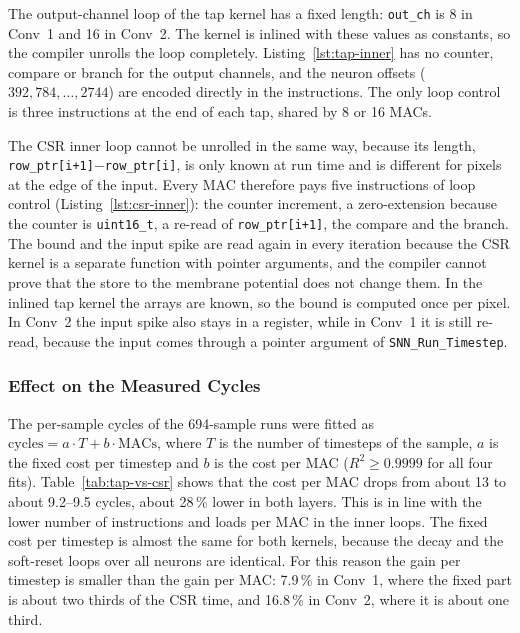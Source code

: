 The output-channel loop of the tap kernel has a fixed length: \texttt{out\_ch} is 8 in Conv~1
and 16 in Conv~2. The kernel is inlined with these values as constants, so the compiler unrolls
the loop completely. Listing~\ref{lst:tap-inner} has no counter, compare or branch for the
output channels, and the neuron offsets ($392, 784, \dots, 2744$) are encoded directly in the
instructions. The only loop control is three instructions at the end of each tap, shared by 8
or 16 MACs.

The CSR inner loop cannot be unrolled in the same way, because its length,
\texttt{row\_ptr[i+1]}$-$\texttt{row\_ptr[i]}, is only known at run time and is different for
pixels at the edge of the input. Every MAC therefore pays five instructions of loop control
(Listing~\ref{lst:csr-inner}):
the counter increment, a zero-extension because the counter is \texttt{uint16\_t}, a re-read of
\texttt{row\_ptr[i+1]}, the compare and the branch. The bound and the input spike are read again
in every iteration because the CSR kernel is a separate function with pointer arguments, and the
compiler cannot prove that the store to the membrane potential does not change them. In the
inlined tap kernel the arrays are known, so the bound is computed once per pixel. In Conv~2 the
input spike also stays in a register, while in Conv~1 it is still re-read, because the input
comes through a pointer argument of \texttt{SNN\_Run\_Timestep}.

\subsubsection*{Effect on the Measured Cycles}

The per-sample cycles of the 694-sample runs were fitted as
$\mathrm{cycles} = a \cdot T + b \cdot \mathrm{MACs}$, where $T$ is the number of timesteps of the
sample, $a$ is the fixed cost per timestep and $b$ is the cost per MAC ($R^2 \geq 0.9999$ for
all four fits). Table~\ref{tab:tap-vs-csr} shows that the cost per MAC drops from about 13 to
about 9.2--9.5 cycles, about 28\,\% lower in both layers. This is in line with the lower number
of instructions and loads per MAC in the inner loops. The fixed cost per timestep is almost the same for both kernels, because
the decay and the soft-reset loops over all neurons are identical. For this reason the gain per
timestep is smaller than the gain per MAC: 7.9\,\% in Conv~1, where the fixed part is about
two thirds of the CSR time, and 16.8\,\% in Conv~2, where it is about one third.

